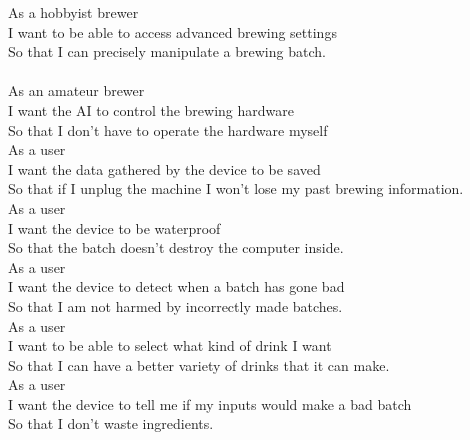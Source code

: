 \documentclass[letterpaper,10pt]{article}
\begin{document}
As a hobbyist brewer\\
I want to be able to access advanced brewing settings\\
So that I can precisely manipulate a brewing batch.\\
\\
As an amateur brewer\\
I want the AI to control the brewing hardware\\
So that I don't have to operate the hardware myself\\

As a user\\
I want the data gathered by the device to be saved\\
So that if I unplug the machine I won't lose my past brewing information.\\

As a user\\
I want the device to be waterproof\\
So that the batch doesn't destroy the computer inside.\\

As a user\\
I want the device to detect when a batch has gone bad\\
So that I am not harmed by incorrectly made batches.\\

As a user\\
I want to be able to select what kind of drink I want\\
So that I can have a better variety of drinks that it can make.\\

As a user\\
I want the device to tell me if my inputs would make a bad batch\\
So that I don't waste ingredients.\\
\end{document}

